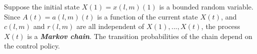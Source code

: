 


Suppose the initial state $X(1)={x(l,m)(1)}$ is a bounded random variable. Since $A(t)={a(l,m)(t)}$ is a function of the current state $X(t)$, and $c(l,m)$ and $r(l,m)$ are all independent of $X(1),...,X(t)$, the process $X(t)$ is a \textit{\textbf{Markov chain}}. The transition probabilities of the chain depend on the control policy.


